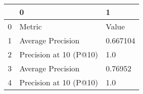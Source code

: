 \begin{tabular}{lll}
\toprule
{} &                       0 &         1 \\
\midrule
0 &                  Metric &     Value \\
1 &       Average Precision &  0.667104 \\
2 &  Precision at 10 (P@10) &       1.0 \\
3 &       Average Precision &   0.76952 \\
4 &  Precision at 10 (P@10) &       1.0 \\
\bottomrule
\end{tabular}
